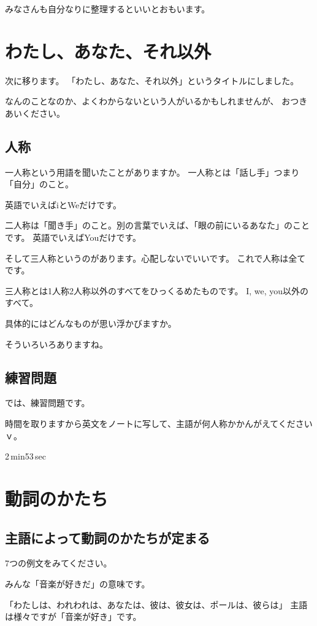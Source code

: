 \documentclass[book,jafontscale=0.9247]{jlreq}
\newcommand{\myMouse}{%
  {\large \ComputerMouse}
}
\begin{document}
みなさんも自分なりに整理するといいとおもいます。

\section{わたし、あなた、それ以外}

次に移ります。
「わたし、あなた、それ以外」というタイトルにしました。

なんのことなのか、よくわからないという人がいるかもしれませんが、
おつきあいください。

\subsection{人称}

一人称という用語を聞いたことがありますか。
一人称とは「話し手」つまり「自分」のこと。

英語でいえばiとWeだけです。

二人称は「聞き手」のこと。別の言葉でいえば、「眼の前にいるあなた」のことです。
英語でいえばYouだけです。

そして三人称というのがあります。心配しないでいいです。
これで人称は全てです。

三人称とは1人称2人称以外のすべてをひっくるめたものです。
I, we, you以外のすべて。
\myMouse
具体的にはどんなものが思い浮かびますか。

そういろいろありますね。

\subsection{練習問題}

では、練習問題です。

時間を取りますから英文をノートに写して、主語が何人称かかんがえてくださいｖ。

2\,min53\,sec

\section{動詞のかたち}
\subsection{主語によって動詞のかたちが定まる}

7つの例文をみてください。

みんな「音楽が好きだ」の意味です。

「わたしは、われわれは、あなたは、彼は、彼女は、ポールは、彼らは」
主語は様々ですが「音楽が好き」です。
\end{document}
